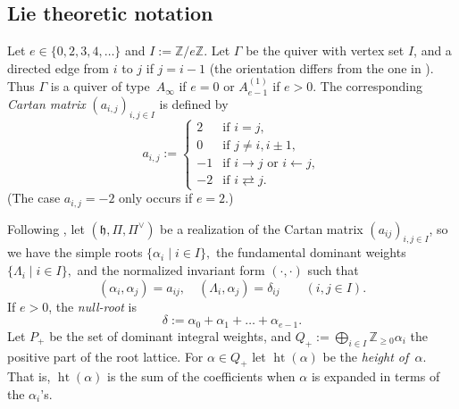 \documentclass[twoside,11pt,reqno]{amsart}
\numberwithin{equation}{section}
\theoremstyle{definition}  %
\newcommand{\Z}{\mathbb{Z}}
\newcommand{\0}{{\bar 0}}
\newcommand{\1}{{\bar 1}}
\newcommand{\Ga}{\Gamma}
\newcommand{\La}{\Lambda}
\newcommand{\al}{\alpha}
\newcommand{\de}{\delta}
\def\h{{\mathfrak h}}
\def\nslash{\:\notslash\:}
\def\height{{\operatorname{ht}}}
\begin{document}
\subsection{%
Lie theoretic notation}\label{SSLTN}
Let $e\in\{0,2,3,4,\dots\}$ and $I:=\Z/e\Z.$ %
Let $\Ga$ be the quiver with vertex set  $I$,
and a directed edge from $i$ to $j$ if $j  = i-1$ (the orientation differs from the one in \cite{BK,HM}). 
Thus $\Gamma$ is a quiver of type~$A_\infty$ if $e=0$
or $A_{e-1}^{(1)}$ if $e > 0$. The corresponding {\em Cartan matrix} 
$(a_{i,j})_{i, j \in I}$ is defined by 
\begin{equation}\label{ECM}
a_{i,j} := \left\{
\begin{array}{rl}
2&\text{if $i=j$},\\
0&\text{if $j \neq i, i \pm 1$},\\
-1&\text{if $i \rightarrow j$ or $i \leftarrow j$},\\
-2&\text{if $i \rightleftarrows j$}.
\end{array}\right.
\end{equation}
(The case $a_{i,j}=-2$ only occurs if $e=2$.) 

Following \cite{Kac}, let $(\h,\Pi,\Pi^\vee)$ be a realization of the Cartan matrix $(a_{ij})_{i,j\in I}$, so we have the simple roots 
$\{\al_i\mid i\in I\},$ 
the fundamental dominant weights 
$\{\La_i\mid i\in I\},$ and the normalized invariant form $(\cdot,\cdot)$ such that
$$
(\al_i,\al_j)=a_{ij}, \quad (\La_i,\al_j)=\de_{ij}\qquad(i,j\in I).
$$
If $e>0$, the {\em null-root} is
\begin{equation}\label{E:nullRoot}
\de:=\al_0+\al_1+\dots+\al_{e-1}.
\end{equation}
Let $P_+$ be the set of dominant integral weights, and 
$
Q_+ := \bigoplus_{i \in I} \Z_{\geq 0} \alpha_i
$ 
the positive part of the root lattice. For $\alpha \in Q_+$ let $\height(\alpha)$ be 
the {\em height of~$\al$}. That is, $\height(\al)$ is the sum of the 
coefficients when $\al$ is expanded in terms of the $\alpha_i$'s.
\end{document}
